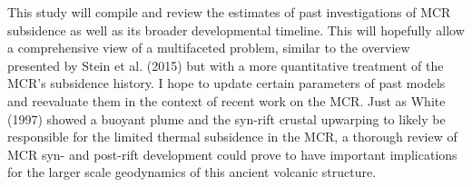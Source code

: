 \documentclass[11pt,letterpaper]{article}
\begin{document}
This study will compile and review the estimates of past investigations of MCR subsidence as well as its broader developmental timeline. This will hopefully allow a comprehensive view of a multifaceted problem, similar to the overview presented by Stein et al. (2015) but with a more quantitative treatment of the MCR's subsidence history. I hope to update certain parameters of past models and reevaluate them in the context of recent work on the MCR. Just as White (1997) showed a buoyant plume and the syn-rift crustal upwarping to likely be responsible for the limited thermal subsidence in the MCR, a thorough review of MCR syn- and post-rift development could prove to have important implications for the larger scale geodynamics of this ancient volcanic structure.




\end{document}
